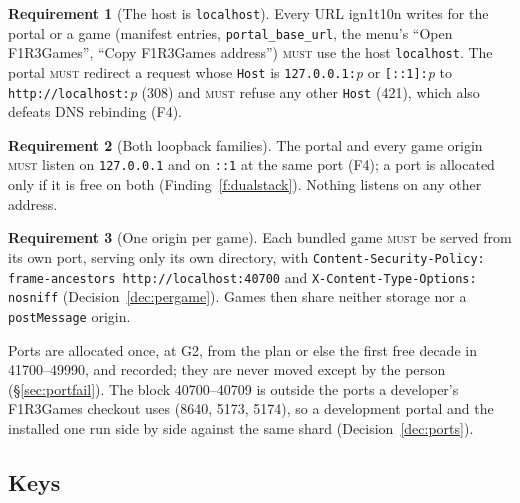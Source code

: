 \documentclass[11pt]{article}
\theoremstyle{definition}
\newtheorem{requirement}{Requirement}
\theoremstyle{remark}
\newcommand{\MUST}{\textsc{must}}
\newcommand{\code}[1]{\texttt{#1}}
\newcommand{\Hr}{ign1t10n}
\newcommand{\Gm}{F1R3Games}
\begin{document}
\begin{requirement}[The host is \code{localhost}]
Every URL \Hr{} writes for the portal or a game (manifest entries,
\code{portal\_base\_url}, the menu's ``Open \Gm{}'', ``Copy \Gm{} address'') \MUST{}
use the host \code{localhost}. The portal \MUST{} redirect a request whose
\code{Host} is \code{127.0.0.1:}\textit{p} or \code{[::1]:}\textit{p} to
\code{http://localhost:}\textit{p} (308) and \MUST{} refuse any other \code{Host}
(421), which also defeats DNS rebinding (F4).
\end{requirement}

\begin{requirement}[Both loopback families]
The portal and every game origin \MUST{} listen on \code{127.0.0.1} and on
\code{::1} at the same port (F4); a port is allocated only if it is free on both
(Finding~\ref{f:dualstack}). Nothing listens on any other address.
\end{requirement}

\begin{requirement}[One origin per game]
Each bundled game \MUST{} be served from its own port, serving only its own
directory, with \code{Content-Security-Policy: frame-ancestors
http://localhost:40700} and \code{X-Content-Type-Options: nosniff}
(Decision~\ref{dec:pergame}). Games then share neither storage nor a
\code{postMessage} origin.
\end{requirement}

\noindent
Ports are allocated once, at G2, from the plan or else the first free decade in
41700--49990, and recorded; they are never moved except by the person
(\S\ref{sec:portfail}). The block 40700--40709 is outside the ports a developer's
\Gm{} checkout uses (8640, 5173, 5174), so a development portal and the installed one
run side by side against the same shard (Decision~\ref{dec:ports}).

\subsection{Keys}\label{sec:gkeys}
\end{document}
